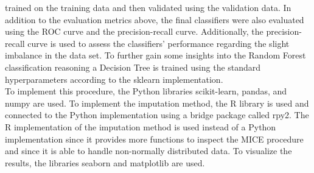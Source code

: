 trained on the training data and then validated using the validation data. 
In addition to the evaluation metrics above, the final classifiers were also 
evaluated using the ROC curve and the precision-recall curve. Additionally, the 
precision-recall curve is used to assess the classifiers' performance 
regarding the slight imbalance in the data set. To further gain some insights 
into the Random Forest classification reasoning a Decision 
Tree is 
trained using the standard hyperparameters according to the sklearn 
implementation.
\\
To implement this procedure, the Python libraries scikit-learn, pandas, and 
numpy are used. To implement the imputation method, the R library  
is used and connected to the Python implementation using a bridge package 
called rpy2. The R implementation of the imputation method is used instead of a 
Python implementation since it provides more functions to inspect the MICE 
procedure and since it is able to handle non-normally distributed data. To 
visualize the results, the libraries seaborn and matplotlib are used.

